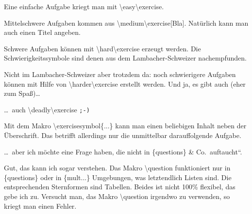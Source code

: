 \documentclass[hyperworksheet]{drcschool}
\makeatletter
\newcommand*{\bcode}{%
   \vskip.5ex\begingroup                                                   %
   \parindent\z@\advance\leftskip4em\ttfamily                              %
   \def\\{\textbackslash}\def\nl{\newline}%
}                                                                          %
\newcommand*{\ecode}{\par\endgroup\vskip.5ex\@doendpe}                     %
\newcommand*{\cs}[1]{\textup{\ttfamily\textbackslash#1}}                   %
\newcommand*{\env}[1]{\textup{\ttfamily\{#1\}}}                            %
\newcommand*{\param}[1]{\mbox{\normalfont$\langle$\textit{#1}$\rangle$}}   %
\makeatother
\begin{document}
\begin{worksheet}

\easy\exercise
Eine einfache Aufgabe kriegt man mit \cs{easy}\cs{exercise}.

\medium\exercise[Bla]
Mittelschwere Aufgaben kommen aus \cs{medium}\cs{exercise[Bla]}. Natürlich kann man auch
einen Titel angeben.

\hard\exercise
Schwere Aufgaben können mit \cs{hard}\cs{exercise} erzeugt werden.
Die Schwierigkeitssymbole sind denen aus dem Lambacher-Schweizer
nachempfunden.

\harder{}
Nicht im Lambacher-Schweizer aber trotzdem da: noch schwierigere Aufgaben
können mit Hilfe von \cs{harder}\cs{exercise} erstellt werden. Und ja, es
gibt auch (eher zum Spaß)\ldots

\deadly\exercise
\ldots\ auch \cs{deadly}\cs{exercise} \texttt{;-)}

\exercisesymbol{$\heartsuit\varheartsuit\heartsuit$}
Mit dem Makro \cs{exercisesymbol\{...\}} kann man einen beliebigen Inhalt neben
der Überschrift. Das betrifft allerdings nur die unmittelbar darauf{}folgende Aufgabe.

\ldots\ aber ich möchte eine Frage haben, die nicht in \env{questions} \& Co.\ auftaucht``.

Gut, das kann ich sogar verstehen. Das Makro \cs{question} funktioniert nur in
\env{questions} oder in \env{mult...} Umgebungen, was letztendlich Listen sind.
Die entsprechenden Sternformen sind Tabellen. Beides ist nicht 100\% flexibel,
das gebe ich zu. Versucht man, das Makro \cs{question} irgendwo zu verwenden,
so kriegt man einen Fehler.


\end{worksheet}
\end{document}
